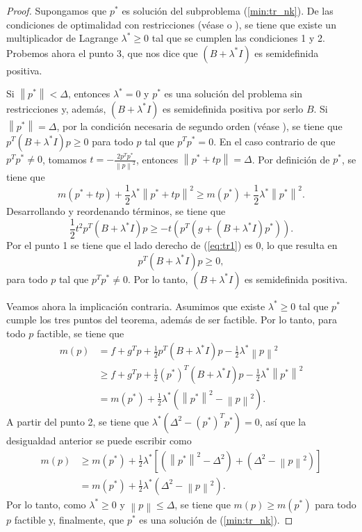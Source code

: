 \documentclass[11pt,a4paper]{book}
\theoremstyle{definition}
\theoremstyle{remark}
\newcommand{\norm}[1]{\left\lVert#1\right\rVert}
\begin{document}
\begin{proof}
Supongamos que $p^*$ es solución del subproblema (\ref{min:tr_nk}). 
De las condiciones de optimalidad con restricciones (véase \cite{Nocedal2006-kh} o \cite{Sun2006-au}), se tiene
que existe un multiplicador de Lagrange $\lambda^* \geq 0$ tal que se cumplen las condiciones 1 y 2. Probemos ahora
el punto 3, que nos dice que $(B+\lambda^* I)$ es semidefinida positiva.

Si $\norm{p^*}<\Delta$, entonces $\lambda^*=0$ y $p^*$ es una solución del problema sin restricciones y, además, $(B+\lambda^* I)$ es semidefinida positiva por serlo $B$.
Si $\norm{p^*}=\Delta$, por la condición necesaria de segundo orden (véase \cite[8.3]{Sun2006-au}), se tiene que $p^T(B+\lambda^* I)p \geq 0$ para todo $p$ tal que $p^Tp^*=0$. En el caso contrario de que $p^Tp^*\neq 0$, tomamos
$t=-\frac{2p^Tp^*}{\norm{p}^2}$, entonces $\norm{p^* +tp}=\Delta$. Por definición de $p^*$, se tiene que
\begin{equation}
m(p^*+tp)+\frac{1}{2}\lambda^* \norm{p^*+tp}^2 \geq m(p^*)+\frac{1}{2}\lambda^* \norm{p^*}^2.
\end{equation}
Desarrollando y reordenando términos, se tiene que
\begin{equation}\label{eq:tr1}
	\frac{1}{2}t^2p^T(B+\lambda^* I)p \geq -t(p^T(g+(B+\lambda^* I)p^*)).
\end{equation}
Por el punto 1 se tiene que el lado derecho de (\ref{eq:tr1}) es $0$, lo que resulta en
\begin{equation}
	p^T(B+\lambda^* I)p \geq 0,
\end{equation}
para todo $p$ tal que $p^Tp^*\neq 0$. Por lo tanto, $(B+\lambda^* I)$ es semidefinida positiva.

Veamos ahora la implicación contraria. Asumimos que existe $\lambda^* \geq 0$ tal que $p^*$ cumple los tres puntos del teorema, además de ser factible. Por lo tanto, para todo $p$ factible, se tiene que
\begin{equation}
	\begin{split}
		m(p) & = f + g^Tp + \frac{1}{2}p^T(B+\lambda^* I)p - \frac{1}{2}\lambda^* \norm{p}^2 \\
		& \geq f + g^Tp + \frac{1}{2}(p^*)^T(B+\lambda^* I)p - \frac{1}{2}\lambda^* \norm{p^*}^2 \\
		& = m(p^*) + \frac{1}{2} \lambda^* \left(\norm{p^*}^2-\norm{p}^2 \right).
	\end{split}
\end{equation}
A partir del punto 2, se tiene que $\lambda^* (\Delta^2 - (p^*)^Tp^*) = 0$, así que la desigualdad anterior se puede
escribir como
\begin{equation}
	\begin{split}
		m(p) & \geq m(p^*) + \frac{1}{2} \lambda^*
		\left[ \left(\norm{p^*}^2-\Delta^2 \right) + \left(\Delta^2 - \norm{p}^2 \right) \right]\\
		& = m(p^*) + \frac{1}{2} \lambda^* \left(\Delta^2 - \norm{p}^2 \right).
	\end{split}
\end{equation}
Por lo tanto, como $\lambda^* \geq 0$ y $\norm{p} \leq \Delta$, se tiene que $m(p) \geq m(p^*)$ para todo $p$ factible y, finalmente, que $p^*$ es una solución de (\ref{min:tr_nk}).


\end{proof}
\end{document}
